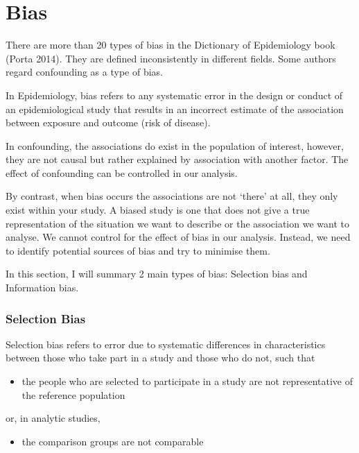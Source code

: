 \documentclass[
  letterpaper,
  DIV=11,
  numbers=noendperiod]{scrreprt}
\providecommand{\tightlist}{%
  \setlength{\itemsep}{0pt}\setlength{\parskip}{0pt}}\usepackage{longtable,booktabs,array}
\begin{document}
\hypertarget{bias}{%
\chapter{Bias}\label{bias}}

There are more than 20 types of bias in the Dictionary of Epidemiology
book (Porta 2014). They are defined inconsistently in different fields.
Some authors regard confounding as a type of bias.

In Epidemiology, bias refers to any systematic error in the design or
conduct of an epidemiological study that results in an incorrect
estimate of the association between exposure and outcome (risk of
disease).

In confounding, the associations do exist in the population of interest,
however, they are not causal but rather explained by association with
another factor. The effect of confounding can be controlled in our
analysis.

By contrast, when bias occurs the associations are not `there' at all,
they only exist within your study. A biased study is one that does not
give a true representation of the situation we want to describe or the
association we want to analyse. We cannot control for the effect of bias
in our analysis. Instead, we need to identify potential sources of bias
and try to minimise them.

In this section, I will summary 2 main types of bias: Selection bias and
Information bias.

\hypertarget{selection-bias}{%
\subsection{Selection Bias}\label{selection-bias}}

Selection bias refers to error due to systematic differences in
characteristics between those who take part in a study and those who do
not, such that

\begin{itemize}
\tightlist
\item
  the people who are selected to participate in a study are not
  representative of the reference population
\end{itemize}

or, in analytic studies,

\begin{itemize}
\tightlist
\item
  the comparison groups are not comparable
\end{itemize}
\end{document}
